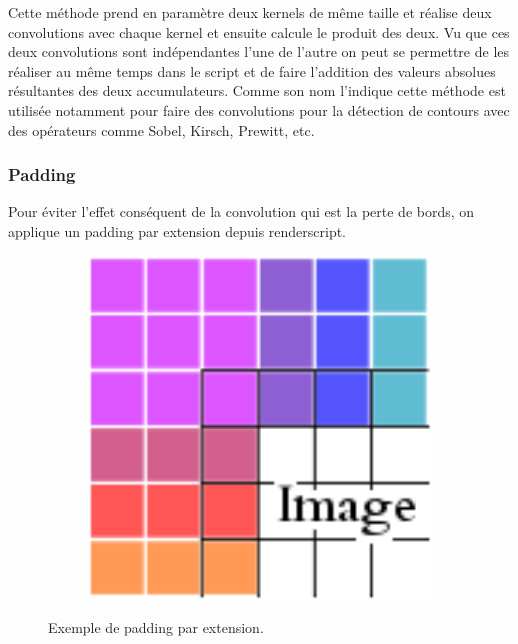         Cette méthode prend en paramètre deux kernels de même taille et réalise deux convolutions avec chaque kernel et ensuite calcule le produit des deux.
        Vu que ces deux convolutions sont indépendantes l'une de l'autre on peut se permettre de les réaliser au même temps dans le script et de faire l'addition
        des valeurs absolues résultantes des deux accumulateurs. Comme son nom l'indique cette méthode est utilisée notamment pour faire des convolutions pour la détection de contours
        avec des opérateurs comme Sobel, Kirsch, Prewitt, etc.
    \\
        

    \subsubsection*{Padding} \label{padding}

        Pour éviter l'effet conséquent de la convolution qui est la perte de bords, on applique un padding par extension depuis renderscript.
        \begin{figure}[!h]
            \centering
            \begin{subfigure}[b]{0.3\textwidth}
                \includegraphics[width=1\textwidth]{report_src/effects/padding.png}
            \end{subfigure}
            \caption*{Exemple de padding par extension.}
        \end{figure} 


